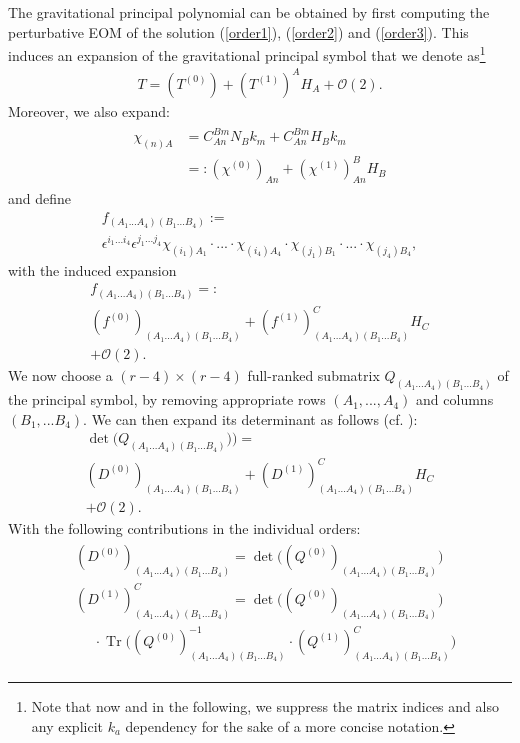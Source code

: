 \documentclass[%
preprint,
nofootinbib,
amsmath,amssymb,
aps,
prd,
floatfix,
]{revtex4-2}
\begin{document}
The gravitational principal polynomial can be obtained by first computing the perturbative EOM of the solution (\ref{order1}), (\ref{order2}) and (\ref{order3}). This induces an expansion of the gravitational principal symbol that we denote as\footnote{Note that now and in the following, we suppress the matrix indices and also any explicit $k_a$ dependency for the sake of a more concise notation.}
\begin{align}
    T = (T^{(0)}) + (T^{(1)})^AH_A + \mathcal{O}(2).
\end{align}
Moreover, we also expand:
\begin{align}
\begin{aligned}
\chi_{(n)A} &=  C^{Bm}_{An} N_B k_m + C^{Bm}_{An} H_B k_m\\
&=: (\chi^{(0)})_{An} + (\chi^{(1)})^B_{An}H_B
\end{aligned}
\end{align}
and define
\begin{multline}\label{PreF}
f_{(A_1...A_4)(B_1...B_4)} := \\
\epsilon^{i_1...i_4} \epsilon^{j_1...j_4} \chi_{(i_1)A_1} \cdot ... \cdot \chi_{(i_4)A_4}\cdot \chi_{(j_1)B_1} \cdot ... \cdot \chi_{(j_4)B_4},
\end{multline}
with the induced expansion
\begin{multline}
f_{(A_1...A_4)(B_1...B_4)} =: \\
(f^{(0)})_{(A_1...A_4)(B_1...B_4)} + (f^{(1)})^C_{(A_1...A_4)(B_1...B_4)}H_C\\
+ \mathcal{O}(2).
\end{multline}
We now choose a $(r-4) \times (r-4)$ full-ranked submatrix $Q_{(A_1...A_4)(B_1...B_4)}$ of the principal symbol, by removing appropriate rows $(A_1,...,A_4)$ and columns $(B_1,...B_4)$. We can then expand its determinant as follows (cf. \cite{IMM2012-03274}):
\begin{multline}
    \operatorname{det}\bigl(Q_{(A_1...A_4)(B_1...B_4)})\bigr) =\\
    (D^{(0)})_{(A_1...A_4)(B_1...B_4)} + (D^{(1)})^C_{(A_1...A_4)(B_1...B_4)}H_C\\
    + \mathcal{O}(2).
\end{multline}
With the following contributions in the individual orders:
\begin{align}\label{polyMatrices}
\begin{aligned}
  &(D^{(0)})_{(A_1...A_4)(B_1...B_4)} =  \operatorname{det}\bigl((Q^{(0)})_{(A_1...A_4)(B_1...B_4)}\bigr) \\
  &(D^{(1)})^C_{(A_1...A_4)(B_1...B_4)} = \operatorname{det}\bigl((Q^{(0)})_{(A_1...A_4)(B_1...B_4)}\bigr) \\
 & \ \ \ \ \ \ \cdot \operatorname{Tr} \bigl ( (Q^{(0)})^{-1}_{(A_1...A_4)(B_1...B_4)} 
   \cdot (Q^{(1)})_{(A_1...A_4)(B_1...B_4)}^C \bigr) 
\end{aligned}
\end{align} 
\end{document}
